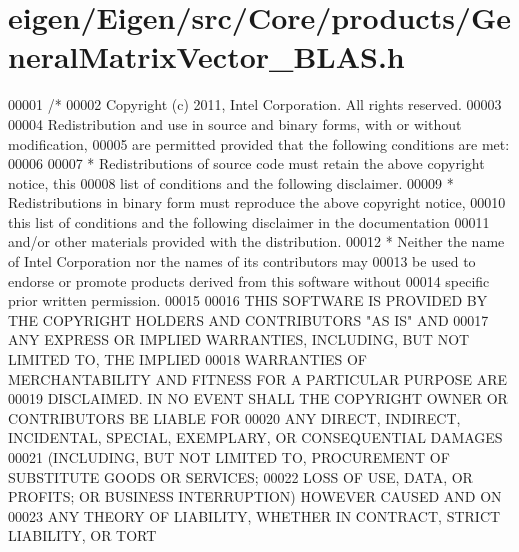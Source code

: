 \hypertarget{eigen_2_eigen_2src_2_core_2products_2_general_matrix_vector___b_l_a_s_8h_source}{}\section{eigen/\+Eigen/src/\+Core/products/\+General\+Matrix\+Vector\+\_\+\+B\+L\+AS.h}
\label{eigen_2_eigen_2src_2_core_2products_2_general_matrix_vector___b_l_a_s_8h_source}

\begin{DoxyCode}
00001 \textcolor{comment}{/*}
00002 \textcolor{comment}{ Copyright (c) 2011, Intel Corporation. All rights reserved.}
00003 \textcolor{comment}{}
00004 \textcolor{comment}{ Redistribution and use in source and binary forms, with or without modification,}
00005 \textcolor{comment}{ are permitted provided that the following conditions are met:}
00006 \textcolor{comment}{}
00007 \textcolor{comment}{ * Redistributions of source code must retain the above copyright notice, this}
00008 \textcolor{comment}{   list of conditions and the following disclaimer.}
00009 \textcolor{comment}{ * Redistributions in binary form must reproduce the above copyright notice,}
00010 \textcolor{comment}{   this list of conditions and the following disclaimer in the documentation}
00011 \textcolor{comment}{   and/or other materials provided with the distribution.}
00012 \textcolor{comment}{ * Neither the name of Intel Corporation nor the names of its contributors may}
00013 \textcolor{comment}{   be used to endorse or promote products derived from this software without}
00014 \textcolor{comment}{   specific prior written permission.}
00015 \textcolor{comment}{}
00016 \textcolor{comment}{ THIS SOFTWARE IS PROVIDED BY THE COPYRIGHT HOLDERS AND CONTRIBUTORS "AS IS" AND}
00017 \textcolor{comment}{ ANY EXPRESS OR IMPLIED WARRANTIES, INCLUDING, BUT NOT LIMITED TO, THE IMPLIED}
00018 \textcolor{comment}{ WARRANTIES OF MERCHANTABILITY AND FITNESS FOR A PARTICULAR PURPOSE ARE}
00019 \textcolor{comment}{ DISCLAIMED. IN NO EVENT SHALL THE COPYRIGHT OWNER OR CONTRIBUTORS BE LIABLE FOR}
00020 \textcolor{comment}{ ANY DIRECT, INDIRECT, INCIDENTAL, SPECIAL, EXEMPLARY, OR CONSEQUENTIAL DAMAGES}
00021 \textcolor{comment}{ (INCLUDING, BUT NOT LIMITED TO, PROCUREMENT OF SUBSTITUTE GOODS OR SERVICES;}
00022 \textcolor{comment}{ LOSS OF USE, DATA, OR PROFITS; OR BUSINESS INTERRUPTION) HOWEVER CAUSED AND ON}
00023 \textcolor{comment}{ ANY THEORY OF LIABILITY, WHETHER IN CONTRACT, STRICT LIABILITY, OR TORT}

\end{DoxyCode}
